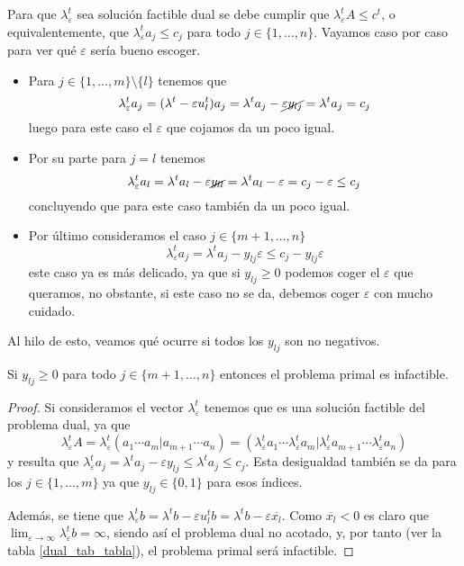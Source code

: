 Para que $\lambda_\varepsilon^t$ sea solución factible dual se debe cumplir que $\lambda_\varepsilon^tA\leq c^t$, o equivalentemente, que $\lambda_\varepsilon^ta_j\leq c_j$ para todo $j\in\{1,\dots,n\}$. Vayamos caso por caso para ver qué $\varepsilon$ sería bueno escoger.
\begin{itemize}
	\item Para $j\in\{1,\dots,m\}\setminus\{l\}$ tenemos que
	\begin{equation*}
		\lambda_\varepsilon^ta_j=(\lambda^t-\varepsilon u_l^t)a_j=\lambda^ta_j-\cancel{\varepsilon y_{lj}}=\lambda^ta_j=c_j
	\end{equation*}
	luego para este caso el $\varepsilon$ que cojamos da un poco igual.
	\item Por su parte para $j=l$ tenemos
	\begin{equation*}
		\lambda_\varepsilon^ta_l=\lambda^ta_l-\varepsilon \cancel{y_{ll}}=\lambda^ta_l-\varepsilon=c_j-\varepsilon\leq c_j
	\end{equation*}
	concluyendo que para este caso también da un poco igual.
	\item Por último consideramos el caso $j\in\{m+1,\dots,n\}$
	\begin{equation*}
		\lambda_\varepsilon^ta_j=\lambda^ta_j-y_{lj}\varepsilon\leq c_j-y_{lj}\varepsilon
	\end{equation*}
	este caso ya es más delicado, ya que si $y_{lj}\geq0$ podemos coger el $\varepsilon$ que queramos, no obstante, si este caso no se da, debemos coger $\varepsilon$ con mucho cuidado.
\end{itemize}
Al hilo de esto, veamos qué ocurre si todos los $y_{lj}$ son no negativos.
\begin{lem}
	\label{dual_lem_testFacti}
	Si $y_{lj}\geq 0$ para todo $j\in\{m+1,\dots,n\}$ entonces el problema primal es infactible.
\end{lem}
\begin{proof}
	Si consideramos el vector $\lambda_\varepsilon^t$ tenemos que es una solución factible del problema dual, ya que \begin{equation*}
		\lambda_\varepsilon^t A = \lambda_\varepsilon^t (a_1\cdots a_m|a_{m+1}\cdots a_n)=(\lambda_\varepsilon^t a_1\cdots \lambda_\varepsilon^t a_m|\lambda_\varepsilon^t a_{m+1}\cdots\lambda_\varepsilon^t a_n)
	\end{equation*}
	y resulta que $\lambda_\varepsilon^ta_j=\lambda^ta_j-\varepsilon y_{lj}\leq \lambda^ta_j\leq c_j$. Esta desigualdad también se da para los $j\in\{1,\dots,m\}$ ya que $y_{lj}\in\{0,1\}$ para esos índices.
	
	Además, se tiene que $\lambda_\varepsilon^tb=\lambda^tb-\varepsilon u_l^tb=\lambda^tb-\varepsilon\overline{x_l}$. Como $\overline{x_l}<0$ es claro que $\lim_{\varepsilon\to\infty}\lambda_\varepsilon^tb=\infty$, siendo así el problema dual no acotado, y, por tanto (ver la tabla \ref{dual_tab_tabla}), el problema primal será infactible.
\end{proof}
